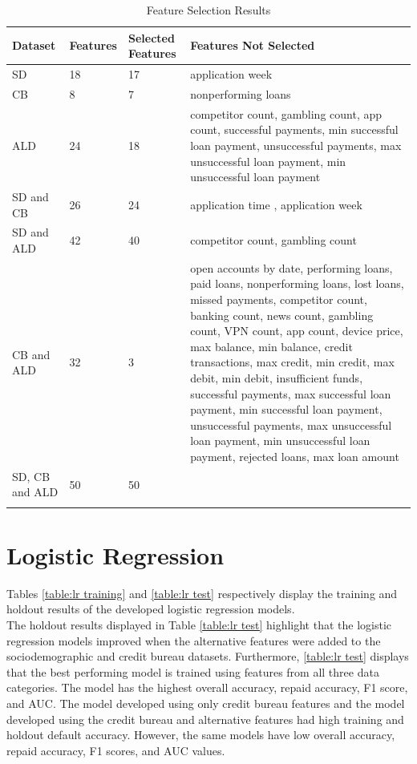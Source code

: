 \begin{longtable}{|p{3cm}|p{2cm}|p{2cm}|p{6cm}|} 
\hline
\multicolumn{1}{|p{3cm}|}{Dataset}
&\multicolumn{1}{|p{2cm}|}{Features}
&\multicolumn{1}{|p{2cm}|}{Selected Features}
&\multicolumn{1}{|p{6cm}|}{Features Not Selected}\\
\hline
SD & 18 & 17 & application week   \\
\hline
CB & 8 & 7 &  nonperforming loans \\
\hline
ALD & 24 & 18  & competitor count, gambling count, app count, successful payments, min  successful loan payment, unsuccessful payments, max unsuccessful loan payment, min unsuccessful loan payment \\
\hline
SD and CB & 26 & 24 &  application time , application week \\
\hline
SD and ALD & 42 & 40 & competitor count, gambling count \\
\hline
CB and ALD & 32 & 3 &  open accounts by date, performing loans, paid loans, nonperforming loans, lost loans, missed payments, competitor count, banking count, news count, gambling count, VPN count, app count, device price, max balance, min balance, credit transactions, max credit, min credit, max debit, min debit, insufficient funds, successful payments, max successful loan payment, min successful loan payment, unsuccessful payments, max unsuccessful loan payment, min unsuccessful loan payment, rejected loans, max loan amount \\
\hline
SD, CB and ALD & 50 & 50 & \\
\hline
\caption{Feature Selection Results}
\label{table:features retained}
\end{longtable}

\vspace{10pt}



\section{Logistic Regression}

Tables \ref{table:lr training} and \ref{table:lr test} respectively display the training and holdout results of the developed logistic regression models. \\

The holdout results displayed in Table \ref{table:lr test} highlight that the logistic regression models improved when the alternative features were added to the sociodemographic and credit bureau datasets. Furthermore, \ref{table:lr test} displays that the best performing model is trained using features from all three data categories. The model has the highest overall accuracy, repaid accuracy, F1 score, and AUC. The model developed using only credit bureau features and the model developed using the credit bureau and alternative features had high training and holdout default accuracy. However, the same models have low overall accuracy, repaid accuracy, F1 scores, and AUC values.  \\

